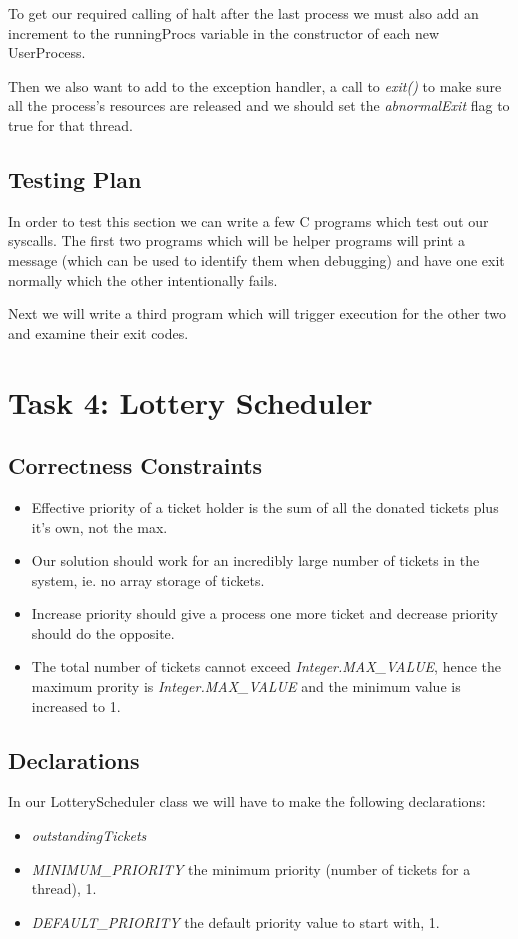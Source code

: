 \documentclass{article}
\begin{document}
To get our required calling of halt after the last process we must also add an increment
to the runningProcs variable in the constructor of each new UserProcess.

Then we also want to add to the exception handler, a call to \textit{exit()} to make sure all
the process's resources are released and we should set the \textit{abnormalExit} flag to true
for that thread.

\subsection*{Testing Plan}

In order to test this section we can write a few C programs which test out our syscalls.
The first two programs which will be helper programs will print a message (which can be used to
identify them when debugging) and have one exit normally which the other intentionally fails.

Next we will write a third program which will trigger execution for the other two and examine
their exit codes.

\section*{Task 4: Lottery Scheduler}

\subsection*{Correctness Constraints}
\begin{itemize}
\item Effective priority of a ticket holder is the sum of all the donated tickets plus it's own, not the max.
\item Our solution should work for an incredibly large number of tickets in the system, ie. no array storage of tickets.
\item Increase priority should give a process one more ticket and decrease priority should do the opposite.
\item The total number of tickets cannot exceed \textit{Integer.MAX\_VALUE}, hence the maximum prority is
\textit{Integer.MAX\_VALUE} and the minimum value is increased to 1.
\end{itemize}

\subsection*{Declarations}
In our LotteryScheduler class we will have to make the following declarations:
\begin{itemize}
\item \textit{outstandingTickets}
\item \textit{MINIMUM\_PRIORITY} the minimum priority (number of tickets for a thread), 1.
\item \textit{DEFAULT\_PRIORITY} the default priority value to start with, 1.
\end{itemize}
\end{document}
